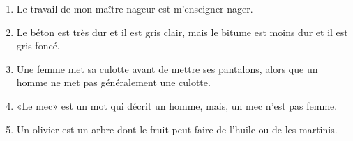 \documentclass[letterpaper]{article}
\begin{document}
\doublespacing
\begin{enumerate}
\item
Le travail de mon maître-nageur est m'enseigner nager.
\item
Le béton est très dur et il est gris clair, mais le bitume est moins dur et il est gris foncé.
\item
Une femme met sa culotte avant de mettre ses pantalons, alors que un homme ne met pas généralement une culotte.
\item
«Le mec» est un mot qui décrit un homme, mais, un mec n'est pas femme.
\item
Un olivier est un arbre dont le fruit peut faire de l'huile ou de les martinis.
\end{enumerate}
\end{document}
